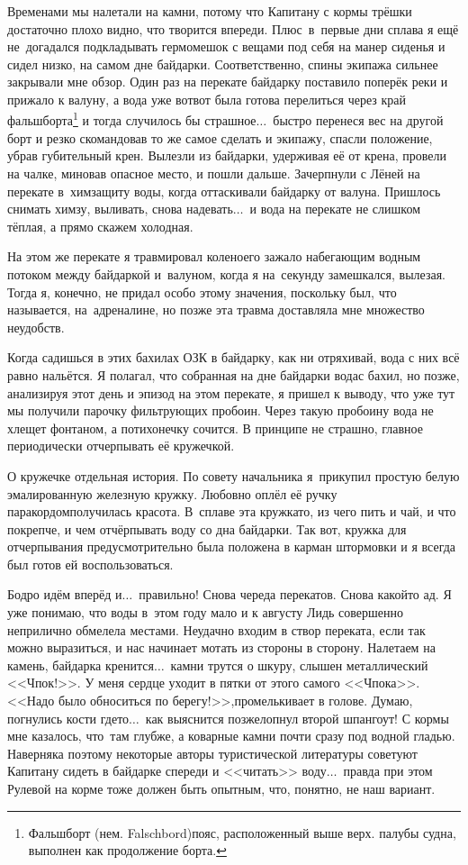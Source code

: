 {
Временами мы налетали на камни, потому что Капитану с кормы трёшки достаточно плохо видно, что творится впереди. Плюс~в~первые дни сплава я ещё не~догадался подкладывать гермомешок с вещами под себя на манер сиденья и сидел низко, на самом дне байдарки. Соответственно, спины экипажа сильнее закрывали мне обзор. Один раз на перекате байдарку поставило поперёк реки и прижало к валуну, а вода уже вот\sdash вот была готова перелиться через край фальшборта\footnote[1]{Фальшборт (нем. Falschbord)\mdash пояс, расположенный выше верх. палубы судна, выполнен как продолжение борта.} и тогда случилось бы страшное$\ldots$~быстро перенеся вес на другой борт и резко скомандовав то же самое сделать и экипажу, спасли положение, убрав губительный крен. Вылезли из байдарки, удерживая её от крена, провели на чалке, миновав опасное место, и пошли дальше. Зачерпнули с Лёней на перекате в~химзащиту воды, когда оттаскивали байдарку от валуна. Пришлось снимать химзу, выливать, снова надевать$\ldots$~и вода на перекате не слишком тёплая, а прямо скажем холодная.
}

На этом же перекате я травмировал колено\mdash его зажало набегающим водным потоком между байдаркой и~валуном, когда я на~секунду замешкался, вылезая. Тогда я, конечно, не придал особо этому значения, поскольку был, что называется, на~адреналине, но позже эта травма доставляла мне множество неудобств.

Когда садишься в этих бахилах ОЗК в байдарку, как ни отряхивай, вода с них всё равно нальётся. Я полагал, что собранная на дне байдарки вода\mdash с бахил, но позже, анализируя этот день и эпизод на этом перекате, я пришел к выводу, что уже тут мы получили парочку фильтрующих пробоин. Через такую пробоину вода не хлещет фонтаном, а потихонечку сочится. В принципе не страшно, главное периодически отчерпывать её кружечкой.

О кружечке отдельная история. По совету начальника я~прикупил простую белую эмалированную железную кружку. Любовно оплёл её ручку паракордом\mdash получилась красота. В~сплаве эта кружка\mdash то, из чего пить и чай, и что покрепче, и чем отчёрпывать воду со дна байдарки. Так вот, кружка для отчерпывания предусмотрительно была положена в карман штормовки и я всегда был готов ей воспользоваться.

Бодро идём вперёд и$\ldots$~правильно! Снова череда перекатов. Снова какой\sdash то ад. Я уже понимаю, что воды в~этом году мало и к августу Лидь совершенно неприлично обмелела местами. Неудачно входим в створ переката, если так можно выразиться, и нас начинает мотать из стороны в сторону. Налетаем на камень, байдарка кренится$\ldots$~камни трутся о шкуру, слышен металлический <<Чпок!>>. У меня сердце уходит в пятки от этого самого <<Чпока>>. <<Надо было обноситься по берегу!>>,\mdash промелькивает в голове. Думаю, погнулись кости где\sdash то$\ldots$~как выяснится позже\mdash лопнул второй шпангоут! С кормы мне казалось, что~там глубже, а коварные камни почти сразу под водной гладью. Наверняка поэтому некоторые авторы туристической литературы советуют Капитану сидеть в байдарке спереди и <<читать>> воду$\ldots$~правда при этом Рулевой на корме тоже должен быть опытным, что, понятно, не наш вариант.

